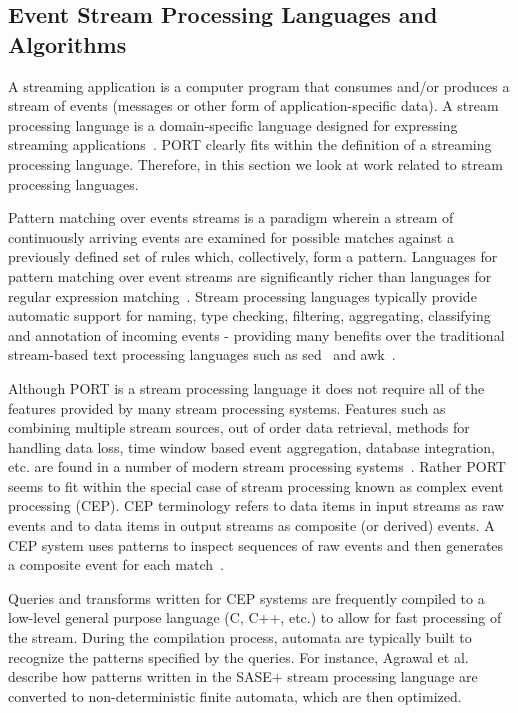 \subsection{Event Stream Processing Languages and Algorithms}

A streaming application
is a computer program
that consumes and/or
produces
a stream of events (messages or other form of application-specific data).
A stream processing language is a domain-specific language
designed for expressing streaming applications~\cite{DBLP:journals/sigmod/HirzelBBVSV18}. PORT clearly
fits within the definition of a streaming processing language.
Therefore, in this
section we look at work related to stream processing languages.

Pattern matching
over events streams is a paradigm
wherein a stream of continuously arriving events are examined for
possible matches against a previously defined set of rules which, collectively, form a pattern.
Languages for pattern matching over event
streams are significantly richer than languages for regular expression
matching~\cite{DBLP:conf/sigmod/AgrawalDGI08}.
Stream processing languages typically provide automatic
support for naming, type checking, filtering, aggregating, classifying and
annotation of incoming events - providing many benefits over the traditional
stream-based text processing languages such as sed~\cite{Mcmahon1979sed} and
awk~\cite{DBLP:journals/spe/AhoKW79}.

Although PORT is a stream processing language it does not
require all of the features provided by many stream processing systems. Features
such as combining multiple stream sources, out of order data retrieval, methods
for handling data loss, time window based event aggregation, database
integration, etc. are found in a number of modern stream processing
systems~\cite{DBLP:journals/csur/DayarathnaP18}.   Rather PORT seems to fit within the special case of
stream processing known as complex event processing (CEP). CEP terminology refers
to data items in input streams as raw events and to data items in output streams
as composite (or derived) events. A CEP system uses patterns to inspect
sequences of raw events and then generates a composite event for each
match~\cite{DBLP:journals/ibmrd/HirzelAGJKKMNSSW13}.

Queries and transforms written for CEP systems are
frequently compiled to a low-level general purpose language (C, C++, etc.) to allow for fast
processing of the stream. During the compilation process, automata are typically
built to recognize the patterns specified by the queries. For instance, Agrawal et
al.~\cite{DBLP:conf/sigmod/AgrawalDGI08} describe how patterns written in the SASE+ stream
processing language are converted to non-deterministic finite automata, which are then
optimized.

